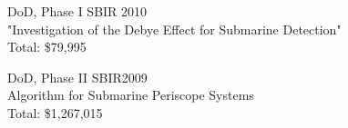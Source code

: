 DoD, Phase I SBIR \dasig  \hfill 2010 \\
"Investigation of the Debye Effect for Submarine Detection" \\
Total: \$79,995

DoD, Phase II SBIR\dasig \hfill 2009 \\
Algorithm for Submarine Periscope Systems \\
Total: \$1,267,015

